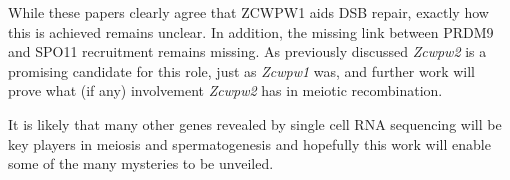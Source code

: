 While these papers clearly agree that ZCWPW1 aids DSB repair, exactly how this is achieved remains unclear.
In addition, the missing link between PRDM9 and SPO11 recruitment remains missing.
As previously discussed \textit{Zcwpw2} is a promising candidate for this role, just as \textit{Zcwpw1} was, and further work will prove what (if any) involvement \textit{Zcwpw2} has in meiotic recombination.

It is likely that many other genes revealed by single cell RNA sequencing will be key players in meiosis and spermatogenesis and hopefully this work will enable some of the many mysteries to be unveiled.

